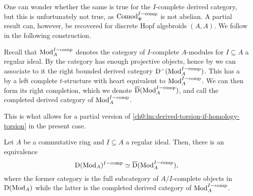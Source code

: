 One can wonder whether the same is true for the $I$-complete derived category, but this is unfortunately not true, as $\mathrm{Comod}_\Psi^{I-\mathrm{comp}}$ is not abelian. A partial result can, however, be recovered for discrete Hopf algebroids $(A, A)$. We follow \cite{barthel-heard-valenzuela_2020} in the following construction. 

\begin{construction}
    \label{ch0:const:completed-derived-category}
    Recall that $\mathrm{Mod}_A^{I-\mathrm{comp}}$ denotes the category of $I$-complete $A$-modules for $I\subseteq A$ a regular ideal. By \cite[2.11]{barthel-heard-valenzuela_2020} the category has enough projective objects, hence by \cite[1.3.2]{Lurie_HA} we can associate to it the right bounded derived category $\mathrm{D}^-(\mathrm{Mod}_A^{I-\mathrm{comp}})$. This has a by \cite[1.3.2.19, 1.3.3.16]{Lurie_HA} a left complete $t$-structure with heart equivalent to $\mathrm{Mod}_A^{I-\mathrm{comp}}$. We can then form its right completion, which we denote $\overline{\mathrm{D}}(\mathrm{Mod}_A^{I-\mathrm{comp}})$, and call the completed derived category of $\mathrm{Mod}_A^{I-\mathrm{comp}}$. 
\end{construction}

This is what allows for a partial version of \cref{ch0:lm:derived-torsion-if-homology-torsion} in the present case. 

\begin{proposition}
    \label{ch0:prop:pulling-out-completion}
    Let $A$ be a commutative ring and $I\subseteq A$ a regular ideal. Then, there is an equivalence 
    \[\mathrm{D}(\mathrm{Mod}_A)^{I-\mathrm{comp}}\simeq \overline{\mathrm{D}}(\mathrm{Mod}_A^{I-\mathrm{comp}}),\]
    where the former category is the full subcategory of $A/I$-complete objects in $\mathrm{D}(\mathrm{Mod}_A)$ while the latter is the completed derived category of $\mathrm{Mod}_A^{I-\mathrm{comp}}$. 
\end{proposition}












